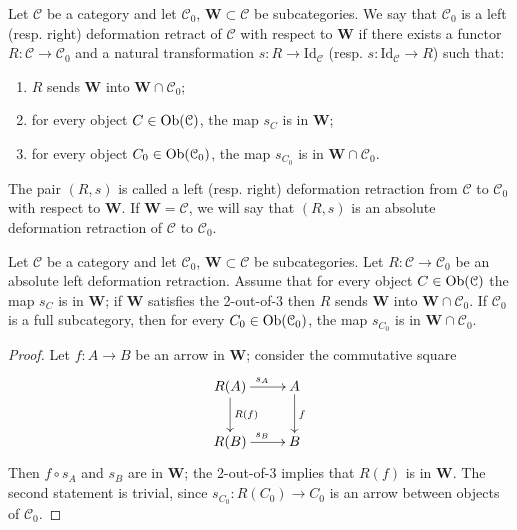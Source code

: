 \begin{refsection}
\begin{defin} \label{def localizing subcategories}
Let $\mathcal C$ be a category and let $\mathcal C_0$, $\mathbf W \subset \mathcal C$ be subcategories. We say that $\mathcal C_0$ is a left (resp. right) deformation retract of $\mathcal C$ with respect to $\mathbf W$ if there exists a functor $R \colon \mathcal C \to \mathcal C_0$ and a natural transformation $s \colon R \to \mathrm{Id}_{\mathcal C}$ (resp. $s \colon \mathrm{Id}_{\mathcal C} \to R$) such that:
\begin{enumerate}
\item $R$ sends $\mathbf W$ into $\mathbf W \cap \mathcal C_0$;
\item for every object $C \in \operatorname{Ob}(\mathcal C)$, the map $s_C$ is in $\mathbf W$;
\item for every object $C_0 \in \operatorname{Ob}(\mathcal C_0)$, the map $s_{C_0}$ is in $\mathbf W \cap \mathcal C_0$.
\end{enumerate}
The pair $(R,s)$ is called a left (resp. right) deformation retraction from $\mathcal C$ to $\mathcal C_0$ with respect to $\mathbf W$. If $\mathbf W = \mathcal C$, we will say that $(R,s)$ is an absolute deformation retraction of $\mathcal C$ to $\mathcal C_0$.
\end{defin}

\begin{lemma} \label{lemma localizing subcategories}
Let $\mathcal C$ be a category and let $\mathcal C_0$, $\mathbf W \subset \mathcal C$ be subcategories. Let $R \colon \mathcal C \to \mathcal C_0$ be an absolute left deformation retraction. Assume that for every object $C \in \operatorname{Ob}(\mathcal C)$ the map $s_C$ is in $\mathbf W$; if $\mathbf W$ satisfies the 2-out-of-3 then $R$ sends $\mathbf W$ into $\mathbf W \cap \mathcal C_0$. If $\mathcal C_0$ is a full subcategory, then for every $C_0 \in \operatorname{Ob}(\mathcal C_0)$, the map $s_{C_0}$ is in $\mathbf W \cap \mathcal C_0$.
\end{lemma}

\begin{proof}
Let $f \colon A \to B$ be an arrow in $\mathbf W$; consider the commutative square
\[
\xymatrix{
R(A) \ar[d]^{R(f)} \ar[r]^{s_A} & A \ar[d]^f \\ R(B) \ar[r]^{s_B} & B
}
\]
Then $f \circ s_A$ and $s_B$ are in $\mathbf W$; the 2-out-of-3 implies that $R(f)$ is in $\mathbf W$. The second statement is trivial, since $s_{C_0} \colon R(C_0) \to C_0$ is an arrow between objects of $\mathcal C_0$.
\end{proof}


\end{refsection}
